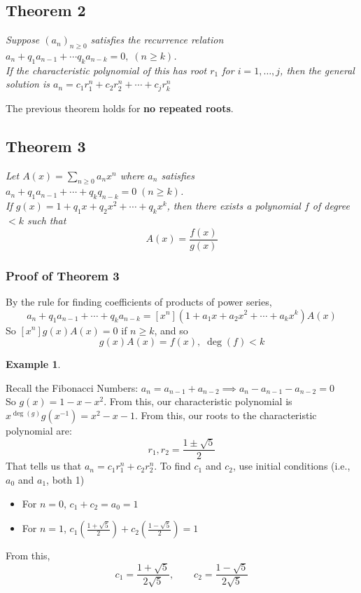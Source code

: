 \documentclass{report}
\newtheorem{ex}{Example}[section]
\begin{document}
\subsection{Theorem 2}
\begin{center}
\textit{Suppose $(a_n)_{n \geq 0}$ satisfies the recurrence relation $a_n + q_1a_{n-1} + \cdots q_k a_{n-k} = 0, \; (n \geq k)$.\\If the characteristic polynomial of this has root $r_1$ for $i=1, \ldots, j$, then the general solution is $a_n = c_1r_1^n + c_2r_2^n + \cdots + c_jr_k^n$}
\end{center}
The previous theorem holds for \textbf{no repeated roots}.
\subsection{Theorem 3}
\begin{center}
\textit{Let $A(x) = \displaystyle\sum_{n \geq 0}a_nx^n$ where $a_n$ satisfies $a_n + q_1a_{n-1} + \cdots + q_kq_{n-k} = 0 \; (n \geq k)$.\\If $g(x) = 1 + q_1x + q_2x^2 + \cdots + q_kx^k$, then there exists a polynomial $f$ of degree $< k$ such that
$$A(x) = \frac{f(x)}{g(x)}$$}
\end{center}
\subsubsection{Proof of Theorem 3}
By the rule for finding coefficients of products of power series,
$$a_n + q_1a_{n-1} + \cdots + q_ka_{n-k} = [x^n](1 + a_1x + a_2x^2 + \cdots + a_kx^k)A(x)$$
So $[x^n]g(x)A(x) = 0$ if $n \geq k$, and so
$$g(x)A(x) = f(x), \; \deg(f) < k$$
\begin{ex}
\end{ex}
\noindent
Recall the Fibonacci Numbers: $a_n = a_{n-1} + a_{n-2} \implies a_n - a_{n-1} - a_{n-2} = 0$\\
So $g(x) = 1 - x - x^2$. From this, our characteristic polynomial is $x^{\deg(g)}g(x^{-1}) = x^2 - x - 1$. From this, our roots to the characteristic polynomial are:
$$r_1, r_2 = \frac{1 \pm \sqrt{5}}{2}$$
That tells us that $a_n = c_1r^n_1 + c_2r_2^n$. To find $c_1$ and $c_2$, use initial conditions (i.e., $a_0$ and $a_1$, both 1)
\begin{itemize}
\item For $n=0$, $c_1 + c_2 = a_0 = 1$
\item For $n=1$, $c_1 \displaystyle\left(\frac{1 + \sqrt{5}}{2}\right) + c_2 \displaystyle\left(\frac{1 - \sqrt{5}}{2}\right) = 1$
\end{itemize}
From this, $$c_1 = \frac{1 + \sqrt{5}}{2\sqrt{5}}, \qquad c_2 = \frac{1 - \sqrt{5}}{2\sqrt{5}}$$
\end{document}

